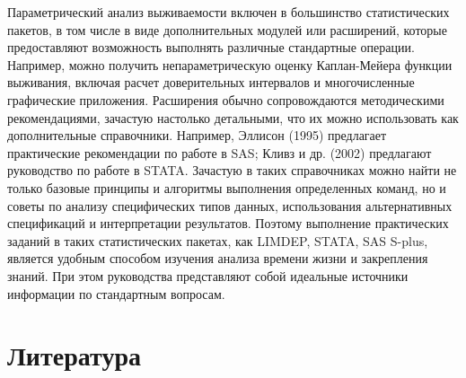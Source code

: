 \noindent
Параметрический анализ выживаемости включен в большинство статистических пакетов, в том числе в виде дополнительных модулей или расширений, которые предоставляют возможность выполнять различные стандартные операции. Например, можно получить непараметрическую оценку Каплан-Мейера функции выживания, включая расчет доверительных интервалов и многочисленные графические приложения. Расширения обычно сопровождаются методическими рекомендациями, зачастую настолько детальными, что их можно использовать как дополнительные справочники. Например, Эллисон (1995) предлагает практические рекомендации по работе в SAS; Кливз и др. (2002) предлагают руководство по работе в STATA. Зачастую в таких справочниках можно найти не только базовые принципы и алгоритмы выполнения определенных команд, но и советы по анализу специфических типов данных, использования альтернативных спецификаций и интерпретации результатов. Поэтому выполнение практических заданий в таких статистических пакетах, как LIMDEP, STATA, SAS S-plus, является удобным способом изучения анализа времени жизни и закрепления знаний. При этом руководства представляют собой идеальные источники информации по стандартным вопросам.




\section{Литература}\label{sec:17.13}

